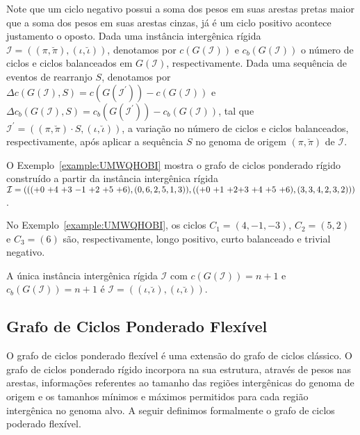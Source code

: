 Note que um ciclo negativo possui a soma dos pesos em suas arestas pretas maior que a soma dos pesos em suas arestas cinzas, já é um ciclo positivo acontece justamento o oposto. Dada uma instância intergênica rígida $\mathcal{I} = ((\pi,\breve\pi),(\iota,\breve\iota))$, denotamos por $c(G(\mathcal{I}))$ e $c_b(G(\mathcal{I}))$ o número de ciclos e ciclos balanceados em $G(\mathcal{I})$, respectivamente. Dada uma sequência de eventos de rearranjo $S$, denotamos por $\Delta c(G(\mathcal{I}), S) = c(G(\mathcal{I^{\prime}})) - c(G(\mathcal{I}))$ e $\Delta c_b(G(\mathcal{I}), S) = c_b(G(\mathcal{I^{\prime}})) - c_b(G(\mathcal{I}))$, tal que $\mathcal{I^{\prime}} = ((\pi,\breve\pi) \cdot S,(\iota,\breve\iota))$, a variação no número de ciclos e ciclos balanceados, respectivamente, após aplicar a sequência $S$ no genoma de origem $(\pi,\breve\pi)$ de $\mathcal{I}$.

O Exemplo~\ref{example:UMWQHOBI} mostra o grafo de ciclos ponderado rígido construído a partir da instância intergênica rígida $\mathcal{I} = ((({+0}~{+4}~{+3}~{-1}~{+2}~{+5}~{+6}),(0,6,2,5,1,3)),(({+0}~{+1}~{+2}\break{+3}~{+4}~{+5}~{+6}),(3,3,4,2,3,2)))$.



No Exemplo~\ref{example:UMWQHOBI}, os ciclos $C_1=(4,-1,-3)$, $C_2 = (5,2)$ e $C_3 = (6)$ são, respectivamente, longo positivo, curto balanceado e trivial negativo.

\begin{remark}\label{remark:WVLFPRDL}
  A única instância intergênica rígida $\mathcal{I}$ com $c(G(\mathcal{I})) = n + 1$ e $c_b(G(\mathcal{I})) = n + 1$ é $\mathcal{I} = ((\iota,\breve\iota),(\iota,\breve\iota))$.
\end{remark}

\subsection{Grafo de Ciclos Ponderado Flexível}

O grafo de ciclos ponderado flexível é uma extensão do grafo de ciclos clássico. O grafo de ciclos ponderado rígido incorpora na sua estrutura, através de pesos nas arestas, informações referentes ao tamanho das regiões intergênicas do genoma de origem e os tamanhos mínimos e máximos permitidos para cada região intergênica no genoma alvo. A seguir definimos formalmente o grafo de ciclos poderado flexível.

